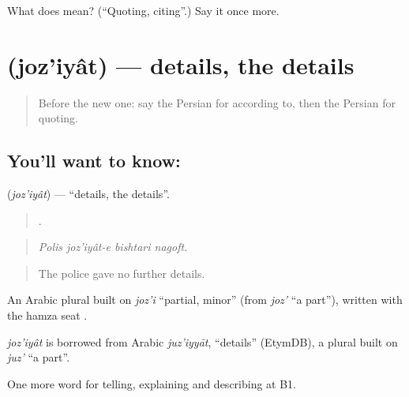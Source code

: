 \begin{tcolorbox}[breakable,colback=teal!4,colframe=teal!35!black,title={Before you move on}]
What does    mean? (\textquotedblleft{}Quoting, citing\textquotedblright{}.) Say it once more.
\end{tcolorbox}
\section[\texorpdfstring{\fa{جزئیات} (joz'iyât)}{جزئیات (joz'iyât)}]{ (joz'iyât) — details, the details}

\label{lesson:FA-C311-joziyat}



\begin{quote}
Before the new one: say the Persian for according to, then the Persian for quoting.
\end{quote}

\subsection*{You'll want to know: }
\textbf{} (\emph{joz'iyât}) — \textquotedblleft{}details, the details\textquotedblright{}.

\begin{quote}
   .
\end{quote}

\begin{quote}
\emph{Polis joz'iyât-e bishtari nagoft.}
\end{quote}

\begin{quote}
The police gave no further details.
\end{quote}

An Arabic plural built on \emph{joz'i} \textquotedblleft{}partial, minor\textquotedblright{} (from \emph{joz'} \textquotedblleft{}a part\textquotedblright{}), written with the hamza seat .

\begin{cousinweb}
\emph{joz'iyât} is borrowed from Arabic \emph{juz'iyyāt}, \textquotedblleft{}details\textquotedblright{} (EtymDB), a plural built on \emph{juz'} \textquotedblleft{}a part\textquotedblright{}.
\end{cousinweb}

\begin{grammarlens}[title={What you've built}]
One more word for telling, explaining and describing at B1.
\end{grammarlens}

